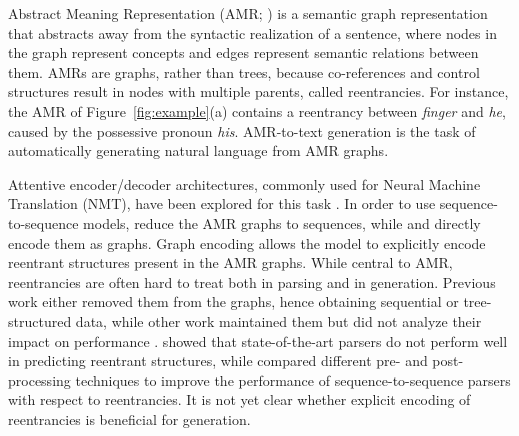 \documentclass[11pt,a4paper]{article}
\begin{document}
Abstract Meaning Representation (AMR; \citealt{Banarescu13abstractmeaning}) is a semantic graph representation that abstracts away from the syntactic realization of a sentence, where nodes in the graph represent concepts and edges represent semantic relations between them. AMRs are graphs, rather than trees, because co-references and control structures result in nodes with multiple parents, called reentrancies. For instance, the AMR of Figure~\ref{fig:example}(a) contains a reentrancy between \emph{finger} and \emph{he}, caused by the possessive pronoun \emph{his}. AMR-to-text generation is the task of automatically generating natural language from AMR graphs.

Attentive encoder/decoder architectures, commonly used for Neural Machine Translation (NMT), have been explored for this task \cite{konstas2017neural,song,beck}. 
In order to use sequence-to-sequence models,  reduce the AMR graphs to sequences, while  and  directly encode them as graphs. Graph encoding allows the model to explicitly encode reentrant structures present in the AMR graphs.
While central to AMR, reentrancies are often hard to treat both in parsing and in generation. Previous work either removed them from the graphs, hence obtaining sequential \cite{konstas2017neural} or tree-structured \cite{liu2018toward,takase2016neural} data, while other work maintained them but did not analyze their impact on performance \cite[e.g.,][]{song,beck}.  showed that state-of-the-art parsers do not perform well in predicting reentrant structures, while  compared different pre- and post-processing techniques to improve the performance of sequence-to-sequence parsers with respect to reentrancies. It is not yet clear whether explicit encoding of reentrancies is beneficial for generation.

\end{document}
